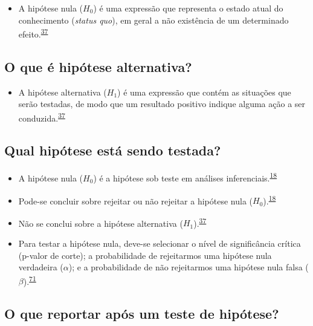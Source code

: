 \documentclass[
]{book}
\providecommand{\tightlist}{%
  \setlength{\itemsep}{0pt}\setlength{\parskip}{0pt}}
\begin{document}
\begin{itemize}
\tightlist
\item
  A hipótese nula (\(H_{0}\)) é uma expressão que representa o estado atual do conhecimento (\emph{status quo}), em geral a não existência de um determinado efeito.\textsuperscript{\protect\hyperlink{ref-kanji2006}{37}}
\end{itemize}

\hypertarget{o-que-uxe9-hipuxf3tese-alternativa}{%
\subsection{O que é hipótese alternativa?}\label{o-que-uxe9-hipuxf3tese-alternativa}}

\begin{itemize}
\tightlist
\item
  A hipótese alternativa (\(H_{1}\)) é uma expressão que contém as situações que serão testadas, de modo que um resultado positivo indique alguma ação a ser conduzida.\textsuperscript{\protect\hyperlink{ref-kanji2006}{37}}
\end{itemize}

\hypertarget{qual-hipuxf3tese-estuxe1-sendo-testada}{%
\subsection{Qual hipótese está sendo testada?}\label{qual-hipuxf3tese-estuxe1-sendo-testada}}

\begin{itemize}
\item
  A hipótese nula (\(H_{0}\)) é a hipótese sob teste em análises inferenciais.\textsuperscript{\protect\hyperlink{ref-Ali2016}{18}}
\item
  Pode-se concluir sobre rejeitar ou não rejeitar a hipótese nula (\(H_{0}\)).\textsuperscript{\protect\hyperlink{ref-Ali2016}{18}}
\item
  Não se conclui sobre a hipótese alternativa (\(H_{1}\)).\textsuperscript{\protect\hyperlink{ref-kanji2006}{37}}
\item
  Para testar a hipótese nula, deve-se selecionar o nível de significância crítica (p-valor de corte); a probabilidade de rejeitarmos uma hipótese nula verdadeira (\(\alpha\)); e a probabilidade de não rejeitarmos uma hipótese nula falsa (\(\beta\)).\textsuperscript{\protect\hyperlink{ref-Curran-Everett2009}{71}}
\end{itemize}

\hypertarget{o-que-reportar-apuxf3s-um-teste-de-hipuxf3tese}{%
\subsection{O que reportar após um teste de hipótese?}\label{o-que-reportar-apuxf3s-um-teste-de-hipuxf3tese}}
\end{document}
